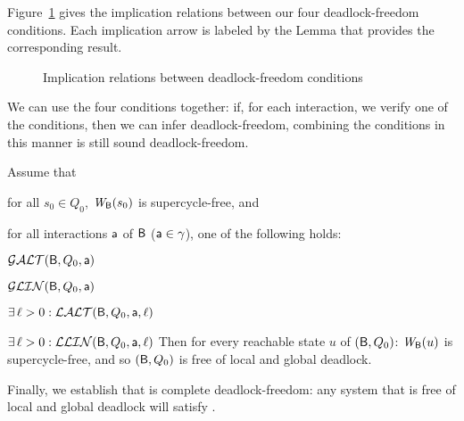 

Figure~\ref{fig:implications} gives the implication relations between our four deadlock-freedom conditions.
Each implication arrow is labeled by the Lemma that provides the corresponding result.
\begin{figure}[ht]
\begin{center}
\scalebox{0.8}{}
\caption{Implication relations between deadlock-freedom conditions}
\label{fig:implications}
\end{center}
\end{figure}


We can use the four conditions together: if, for each interaction, we verify one of the conditions, then we can infer deadlock-freedom, \ie combining the conditions in this manner is still sound \wrt deadlock-freedom.

\label{theorem:local.deadlock-free}
Assume that
\bn
\item \label{theorem:local.deadlock-free.initial}
      for all $s_0 \in Q_0$, $\mathit{W}_{\mathsf{B}}({s_0})$ is supercycle-free, and
\item \label{theorem:local.deadlock-free.scfPres}
      for all interactions $\mathsf{a}$ of $\mathsf{B}$ (\ie $\mathsf{a} \in \gamma$), one of
      the following holds:
      \bn
      \item $\mathcal{GALT}(\mathsf{B},Q_0,\mathsf{a})$
      \item $\mathcal{GLIN}(\mathsf{B},Q_0,\mathsf{a})$
      \item $\exists\, \ell > 0: \mathcal{LALT}(\mathsf{B},Q_0,\mathsf{a},\ell)$ 
      \item $\exists\, \ell > 0: \mathcal{LLIN}(\mathsf{B},Q_0,\mathsf{a},\ell)$ 
      \en
\en
Then for every reachable state $u$ of $(\mathsf{B}, Q_0)$:  $\mathit{W}_{\mathsf{B}}({u})$ is supercycle-free, and so 
$(\mathsf{B}, Q_0)$ is free of local and global deadlock.
\et
{}




Finally, we establish that \GAO is complete \wrt deadlock-freedom: any system that is free of local and global deadlock will satisfy \GAO.

